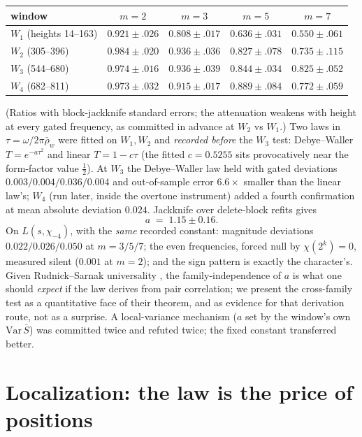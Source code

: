 \documentclass[11pt]{article}
\theoremstyle{definition}
\theoremstyle{remark}
\begin{document}
\begin{center}
\begin{tabular}{lcccc}
\hline
window & $m=2$ & $m=3$ & $m=5$ & $m=7$ \\
\hline
$W_1$ (heights 14--163) & $0.921 \pm .026$ & $0.808 \pm .017$ & $0.636 \pm .031$ & $0.550 \pm .061$ \\
$W_2$ (305--396) & $0.984 \pm .020$ & $0.936 \pm .036$ & $0.827 \pm .078$ & $0.735 \pm .115$ \\
$W_3$ (544--680) & $0.974 \pm .016$ & $0.936 \pm .039$ & $0.844 \pm .034$ & $0.825 \pm .052$ \\
$W_4$ (682--811) & $0.973 \pm .032$ & $0.915 \pm .017$ & $0.889 \pm .084$ & $0.772 \pm .059$ \\
\hline
\end{tabular}
\end{center}

\noindent (Ratios with block-jackknife standard errors; the attenuation weakens with height at
every gated frequency, as committed in advance at $W_2$ vs $W_1$.) Two laws in
$\tau = \omega/2\pi\bar\rho_w$ were fitted on $W_1, W_2$ and \emph{recorded before} the $W_3$
test: Debye--Waller $T = e^{-a\tau^2}$ and linear $T = 1 - c\tau$ (the fitted $c = 0.5255$ sits
provocatively near the form-factor value $\tfrac12$). At $W_3$ the Debye--Waller law held with
gated deviations $0.003/0.004/0.036/0.004$ and out-of-sample error $6.6\times$ smaller than the
linear law's; $W_4$ (run later, inside the overtone instrument) added a fourth confirmation at
mean absolute deviation $0.024$. Jackknife over delete-block refits gives
\[
a \;=\; 1.15 \pm 0.16 .
\]
On $L(s, \chi_{-4})$, with the \emph{same} recorded constant: magnitude deviations
$0.022/0.026/0.050$ at $m = 3/5/7$; the even frequencies, forced null by $\chi(2^k) = 0$, measured
silent ($0.001$ at $m = 2$); and the sign pattern is exactly the character's. Given
Rudnick--Sarnak universality \cite{RudnickSarnak}, the family-independence of $a$ is what one
should \emph{expect} if the law derives from pair correlation; we present the cross-family test as
a quantitative face of their theorem, and as evidence for that derivation route, not as a
surprise. A local-variance mechanism ($a$ set by the window's own $\mathrm{Var}\,\bar S$) was
committed twice and refuted twice; the fixed constant transferred better.

\section{Localization: the law is the price of positions}
\end{document}
